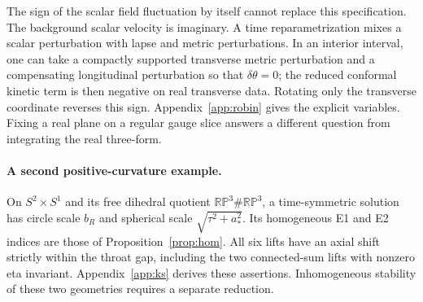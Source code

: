 The sign of the scalar field fluctuation by itself cannot replace this specification. The background scalar velocity is imaginary. A time reparametrization mixes a scalar perturbation with lapse and metric perturbations. In an interior interval, one can take a compactly supported transverse metric perturbation and a compensating longitudinal perturbation so that $\delta\theta=0$; the reduced conformal kinetic term is then negative on real transverse data. Rotating only the transverse coordinate reverses this sign. Appendix~\ref{app:robin} gives the explicit variables. Fixing a real plane on a regular gauge slice answers a different question from integrating the real three-form.

\paragraph{A second positive-curvature example.}
On $S^2\times S^1$ and its free dihedral quotient $\mathbb{RP}^3\#\mathbb{RP}^3$, a time-symmetric solution has circle scale $b_R$ and spherical scale $\sqrt{\tau^2+a_*^2}$. Its homogeneous E1 and E2 indices are those of Proposition~\ref{prop:hom}. All six lifts have an axial shift strictly within the throat gap, including the two connected-sum lifts with nonzero eta invariant. Appendix~\ref{app:ks} derives these assertions. Inhomogeneous stability of these two geometries requires a separate reduction.
